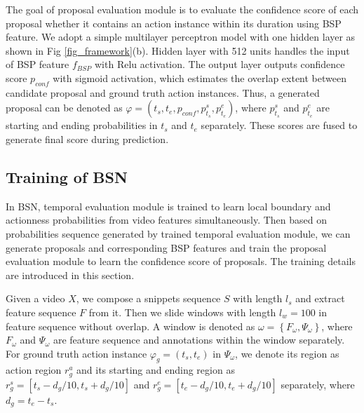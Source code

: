 \documentclass[runningheads]{llncs}
\begin{document}
The goal of proposal evaluation module is to evaluate the confidence score of each proposal whether it contains an action instance within its duration using BSP feature. We adopt a simple multilayer perceptron model with one hidden layer as shown in Fig \ref{fig_framework}(b). Hidden layer with 512 units  handles the input of BSP feature $f_{BSP}$ with Relu  activation. The output layer outputs confidence score $p_{conf}$ with sigmoid activation, which estimates the overlap extent between candidate proposal and ground truth action instances. Thus, a generated proposal can be denoted  as $\varphi=(t_s,t_e,p_{conf},p^s_{t_s},p^e_{t_e})$, where $p^s_{t_s}$ and $p^e_{t_e}$ are starting and ending probabilities in $t_s$ and $t_e$ separately. These scores are fused to generate final score during prediction.



\subsection{Training of BSN }

In BSN, temporal evaluation module is trained to learn local boundary and actionness probabilities  from video features simultaneously. Then based on probabilities sequence generated by trained temporal evaluation module, we can generate proposals and corresponding BSP features and train the proposal evaluation module to learn the confidence score of proposals. The training details are introduced in this section.

Given a video $X$, we compose a snippets sequence $S$ with length $l_s$ and extract feature sequence $F$ from it.
Then we slide windows with length $l_w=100$ in feature sequence without overlap.
A window is denoted as $\omega =\left \{ F_{\omega}, \Psi_{\omega} \right \}$, where $F_{\omega}$ and $\Psi_{\omega}$ are feature sequence and annotations within the window separately.
 For ground truth action instance $\varphi_g=( t_{s},t_{e} )$ in  $\Psi_{\omega}$, we denote its region as action region $r_{g}^a$ and its starting and ending region as $r_g^s=[ t_s-d_g/10,t_s+d_g/10 ]$ and $r_g^e= [ t_e-d_g/10,t_e+d_g/10 ]$ separately, where $d_g=t_e-t_s$.
\end{document}

